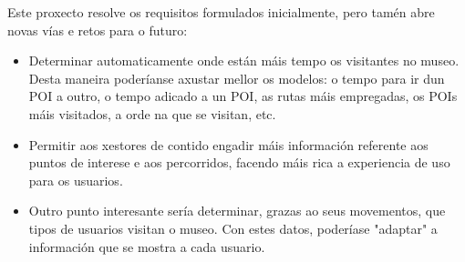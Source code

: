 Este proxecto resolve os requisitos formulados inicialmente, pero tamén abre novas vías e retos para o futuro:

\begin{itemize}
	\item Determinar automaticamente onde están máis tempo os visitantes no museo. Desta maneira poderíanse axustar mellor os modelos: o tempo para ir dun POI a outro, o tempo adicado a un POI, as rutas máis empregadas, os POIs máis visitados, a orde na que se visitan, etc.
	\item Permitir aos xestores de contido engadir máis información referente aos puntos de interese e aos percorridos, facendo máis rica a experiencia de uso para os usuarios.
	\item Outro punto interesante sería determinar, grazas ao seus movementos, que tipos de usuarios visitan o museo. Con estes datos, poderíase "adaptar" a información que se mostra a cada usuario.
\end{itemize}

